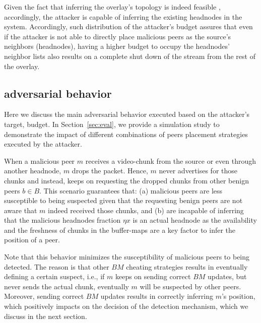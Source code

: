 Given the fact that inferring the overlay's topology is indeed feasible \cite{nguyen2016swap,rbcs}, accordingly, the attacker is capable of inferring the existing headnodes in the system.
Accordingly, such distribution of the attacker's budget assures that even if the attacker is not able to directly place malicious peers as the source's neighbors (headnodes), having a higher budget to occupy the headnodes' neighbor lists also results on a complete shut down of the stream from the rest of the overlay.

\subsection{\drop adversarial behavior}
Here we discuss the main adversarial behavior executed based on the attacker's target, budget.
In Section~\ref{sec:eval}, we provide a simulation study to demonstrate the impact of different combinations of peers placement strategies executed by the attacker.


When a malicious peer $m$ receives a video-chunk from the source or even through another headnode, $m$ drops the packet. 
Hence, $m$ never advertises for those chunks and instead, keeps on requesting the dropped chunks from other benign peers $b \in B$.
This scenario guarantees that: (a) malicious peers are less susceptible to being suspected given that the requesting benign peers are not aware that $m$ indeed received those chunks,
and (b) are incapable of inferring that the malicious headnodes fraction $\eta x$ is an actual headnode as the availability and the freshness of chunks in the buffer-maps are a key factor to infer the position of a peer.

Note that this behavior minimizes the susceptibility of malicious peers to being detected.
The reason is that other $BM$ cheating strategies results in eventually defining a certain suspect, i.e., if $m$ keeps on sending correct $BM$ updates, but never sends the actual chunk, eventually $m$ will be suspected by other peers.
Moreover, sending correct $BM$ updates results in correctly inferring $m$'s position, which positively impacts on the decision of the detection mechanism, which we discuss in the next section. 

